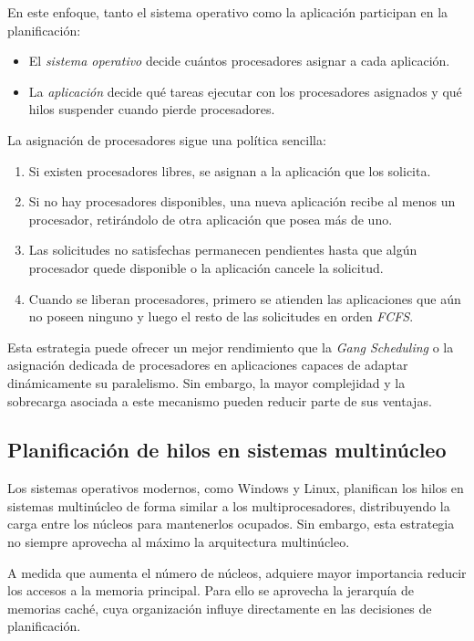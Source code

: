 En este enfoque, tanto el sistema operativo como la aplicación participan en la planificación:
\begin{itemize}
  \item El \textit{sistema operativo} decide cuántos procesadores asignar a cada aplicación.
  \item La \textit{aplicación} decide qué tareas ejecutar con los procesadores asignados y qué hilos suspender cuando pierde procesadores.
\end{itemize}
La asignación de procesadores sigue una política sencilla:
\begin{enumerate}
  \item Si existen procesadores libres, se asignan a la aplicación que los solicita.
  \item Si no hay procesadores disponibles, una nueva aplicación recibe al menos un procesador, retirándolo de otra aplicación que posea más de uno.
  \item Las solicitudes no satisfechas permanecen pendientes hasta que algún procesador quede disponible o la aplicación cancele la solicitud.
  \item Cuando se liberan procesadores, primero se atienden las aplicaciones que aún no poseen ninguno y luego el resto de las solicitudes en orden \textit{FCFS}.
\end{enumerate}

Esta estrategia puede ofrecer un mejor rendimiento que la \textit{Gang Scheduling} o la asignación dedicada de procesadores en aplicaciones capaces de adaptar dinámicamente su paralelismo. Sin embargo, la mayor complejidad y la sobrecarga asociada a este mecanismo pueden reducir parte de sus ventajas.

\subsection{Planificación de hilos en sistemas multinúcleo}

Los sistemas operativos modernos, como Windows y Linux, planifican los hilos en sistemas multinúcleo de forma similar a los multiprocesadores, distribuyendo la carga entre los núcleos para mantenerlos ocupados. Sin embargo, esta estrategia no siempre aprovecha al máximo la arquitectura multinúcleo.

A medida que aumenta el número de núcleos, adquiere mayor importancia reducir los accesos a la memoria principal. Para ello se aprovecha la jerarquía de memorias caché, cuya organización influye directamente en las decisiones de planificación.

